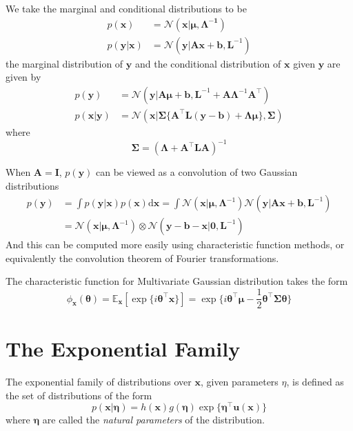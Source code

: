 \documentclass[a4paper]{report}
\newcommand{\ud}{\mathrm{d}}
\renewcommand{\bf}{\mathbf}
\renewcommand{\cal}{\mathcal}
\newcommand{\bb}{\mathbb}
\begin{document}
We take the marginal and conditional distributions to be
\begin{align}
	p(\bf{x}) &= \cal{N}(\bf{x}|\boldsymbol{\mu,\Lambda^{-1}})\\
	p(\bf{y}|\bf{x}) &= \cal{N}(\bf{y}|\bf{Ax}+\bf{b},\bf{L}^{-1})
\end{align}
the marginal distribution of $\bf{y}$ and the conditional distribution of $\bf{x}$ given $\bf{y}$ are given by
\begin{align}
	p(\bf{y})&=\cal{N}(\bf{y}|\bf{A}\boldsymbol{\mu}+\bf{b},\bf{L}^{-1}+\bf{A}\boldsymbol{\Lambda}^{-1}\bf{A}^{\intercal})\\
	p(\bf{x}|\bf{y})&=\cal{N}(\bf{x}|\boldsymbol{\Sigma}\{\bf{A}^{\intercal}\bf{L(y-b)}+\boldsymbol{\Lambda\mu}\},\boldsymbol{\Sigma})
\end{align}
where 
\begin{equation}
	\boldsymbol\Sigma = (\boldsymbol{\Lambda}+\bf{A}^{\intercal}\bf{LA})^{-1}
\end{equation}

When $\bf{A=I}$, $p(\bf{y})$ can be viewed as a convolution of two Gaussian distributions
\begin{align}
	p(\bf{y})&=\int p(\bf{y}|\bf{x})p(\bf{x}) \ud \bf{x}=\int \cal{N}(\bf{x}|\boldsymbol{\mu,\Lambda}^{-1})\cal{N}(\bf{y}|\bf{Ax+b},\bf{L}^{-1})\\
	&=\cal{N}(\bf{x}|\boldsymbol{\mu,\Lambda}^{-1})\otimes\cal{N}(\bf{y-b-x}|\bf{0},\bf{L}^{-1})
\end{align}
And this can be computed more easily using characteristic function methods, or equivalently the convolution theorem of Fourier transformations.

The characteristic function for Multivariate Gaussian distribution takes the form
\begin{equation}
	\phi_{\bf{x}}(\boldsymbol{\theta})=\bb{E}_{\bf{x}}[\exp\{i \boldsymbol{\theta}^{\intercal}\bf{x}\}]=\exp\{i \boldsymbol{\theta}^{\intercal}\boldsymbol{\mu}-\frac{1}{2} \boldsymbol{\theta}^{\intercal}\boldsymbol{\Sigma \theta} \}
\end{equation}
\section{The Exponential Family}
The exponential family of distributions over $\bf{x}$, given parameters $\eta$, is defined as the set of distributions of the form
\begin{equation}
	p(\bf{x}|\boldsymbol{\eta})=h(\bf{x})g(\boldsymbol{\eta})\exp\{\boldsymbol{\eta}^{\intercal}\bf{u(x)}\}
\end{equation}
where $\boldsymbol\eta$ are called the \emph{natural parameters} of the distribution. 
\end{document}
